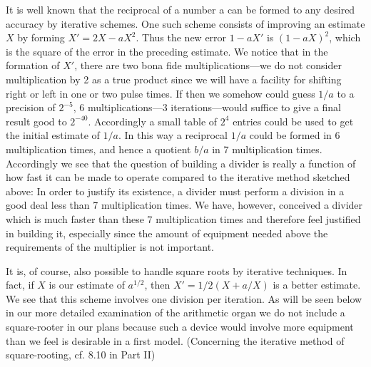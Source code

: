 \documentclass[12pt]{amsart}
\begin{document}
It is well known that the reciprocal of a number a can be formed to any desired accuracy by iterative schemes. One such scheme consists of improving an estimate $X$ by forming $X' = 2X - aX^2$. Thus the new error $1 - aX'$ is $(1 - aX)^2$, which is the square of the error in the preceding estimate. We notice that in the formation of $X'$, there are two bona fide multiplications---we do not consider multiplication by 2 as a true product since we will have a facility for shifting right or left in one or two pulse times. If then we somehow could guess $1/a$ to a precision of $2^{-5}$, 6 multiplications---3 iterations---would suffice to give a final result good to $2^{-40}$. Accordingly a small table of $2^4$ entries could be used to get the initial estimate of $1/a$. In this way a reciprocal $1/a$ could be formed in 6 multiplication times, and hence a quotient $b/a$ in 7 multiplication times. Accordingly we see that the question of building a divider is really a function of how fast it can be made to operate compared to the iterative method sketched above: In order to justify its existence, a divider must perform a division in a good deal less than 7 multiplication times. We have, however, conceived a divider which is much faster than these 7 multiplication times and therefore feel justified in building it, especially since the amount of equipment needed above the requirements of the multiplier is not important.

It is, of course, also possible to handle square roots by iterative techniques. In fact, if $X$ is our estimate of $a^{1/2}$, then $X' = 1/2(X + a/X)$ is a better estimate. We see that this scheme involves one division per iteration. As will be seen below in our more detailed examination of the arithmetic organ we do not include a square-rooter in our plans because such a device would involve more equipment than we feel is desirable in a first model. (Concerning the iterative method of square-rooting, cf. 8.10 in Part II)
\end{document}
